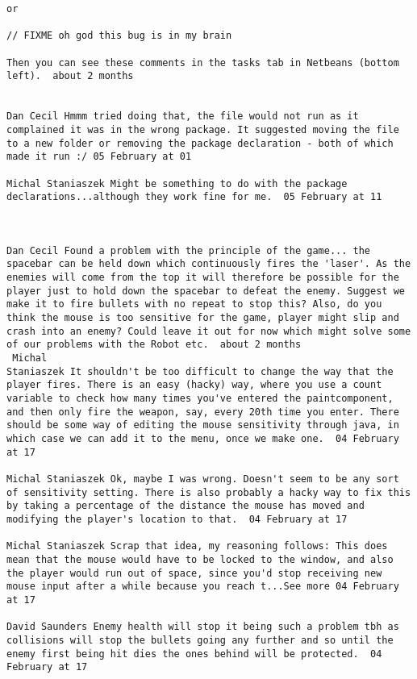 \documentclass[10pt]{report}
\begin{document}
\begin{verbatim}
or

// FIXME oh god this bug is in my brain

Then you can see these comments in the tasks tab in Netbeans (bottom
left).  about 2 months 


Dan Cecil Hmmm tried doing that, the file would not run as it
complained it was in the wrong package. It suggested moving the file
to a new folder or removing the package declaration - both of which
made it run :/ 05 February at 01

Michal Staniaszek Might be something to do with the package
declarations...although they work fine for me.  05 February at 11



Dan Cecil Found a problem with the principle of the game... the
spacebar can be held down which continuously fires the 'laser'. As the
enemies will come from the top it will therefore be possible for the
player just to hold down the spacebar to defeat the enemy. Suggest we
make it to fire bullets with no repeat to stop this? Also, do you
think the mouse is too sensitive for the game, player might slip and
crash into an enemy? Could leave it out for now which might solve some
of our problems with the Robot etc.  about 2 months 
 Michal
Staniaszek It shouldn't be too difficult to change the way that the
player fires. There is an easy (hacky) way, where you use a count
variable to check how many times you've entered the paintcomponent,
and then only fire the weapon, say, every 20th time you enter. There
should be some way of editing the mouse sensitivity through java, in
which case we can add it to the menu, once we make one.  04 February
at 17

Michal Staniaszek Ok, maybe I was wrong. Doesn't seem to be any sort
of sensitivity setting. There is also probably a hacky way to fix this
by taking a percentage of the distance the mouse has moved and
modifying the player's location to that.  04 February at 17

Michal Staniaszek Scrap that idea, my reasoning follows: This does
mean that the mouse would have to be locked to the window, and also
the player would run out of space, since you'd stop receiving new
mouse input after a while because you reach t...See more 04 February
at 17

David Saunders Enemy health will stop it being such a problem tbh as
collisions will stop the bullets going any further and so until the
enemy first being hit dies the ones behind will be protected.  04
February at 17


\end{verbatim}
\end{document}
